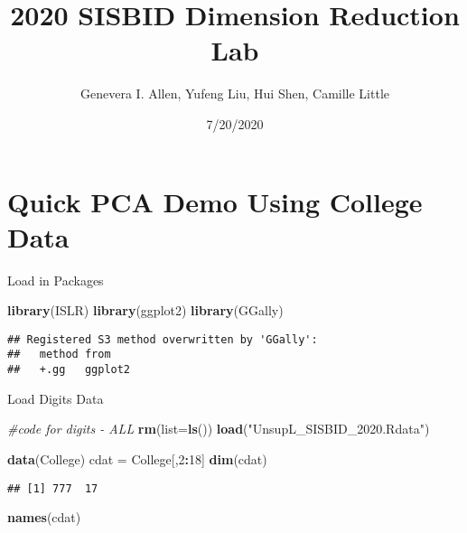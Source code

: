 \documentclass[
]{article}
\title{2020 SISBID Dimension Reduction Lab}
\author{Genevera I. Allen, Yufeng Liu, Hui Shen, Camille Little}
\date{7/20/2020}
\newenvironment{Shaded}{\begin{snugshade}}{\end{snugshade}}
\newcommand{\CommentTok}[1]{\textcolor[rgb]{0.56,0.35,0.01}{\textit{#1}}}
\newcommand{\DataTypeTok}[1]{\textcolor[rgb]{0.13,0.29,0.53}{#1}}
\newcommand{\DecValTok}[1]{\textcolor[rgb]{0.00,0.00,0.81}{#1}}
\newcommand{\KeywordTok}[1]{\textcolor[rgb]{0.13,0.29,0.53}{\textbf{#1}}}
\newcommand{\NormalTok}[1]{#1}
\newcommand{\OperatorTok}[1]{\textcolor[rgb]{0.81,0.36,0.00}{\textbf{#1}}}
\newcommand{\StringTok}[1]{\textcolor[rgb]{0.31,0.60,0.02}{#1}}
\begin{document}
\maketitle

\hypertarget{quick-pca-demo-using-college-data}{%
\section{Quick PCA Demo Using College
Data}\label{quick-pca-demo-using-college-data}}

Load in Packages

\begin{Shaded}
\begin{Highlighting}[]
\KeywordTok{library}\NormalTok{(ISLR)}
\KeywordTok{library}\NormalTok{(ggplot2)}
\KeywordTok{library}\NormalTok{(GGally)}
\end{Highlighting}
\end{Shaded}

\begin{verbatim}
## Registered S3 method overwritten by 'GGally':
##   method from   
##   +.gg   ggplot2
\end{verbatim}

Load Digits Data

\begin{Shaded}
\begin{Highlighting}[]
\CommentTok{#code for digits - ALL}
\KeywordTok{rm}\NormalTok{(}\DataTypeTok{list=}\KeywordTok{ls}\NormalTok{())}
\KeywordTok{load}\NormalTok{(}\StringTok{"UnsupL_SISBID_2020.Rdata"}\NormalTok{)}
\end{Highlighting}
\end{Shaded}

\begin{Shaded}
\begin{Highlighting}[]
\KeywordTok{data}\NormalTok{(College)}
\NormalTok{cdat =}\StringTok{ }\NormalTok{College[,}\DecValTok{2}\OperatorTok{:}\DecValTok{18}\NormalTok{]}
\KeywordTok{dim}\NormalTok{(cdat)}
\end{Highlighting}
\end{Shaded}

\begin{verbatim}
## [1] 777  17
\end{verbatim}

\begin{Shaded}
\begin{Highlighting}[]
\KeywordTok{names}\NormalTok{(cdat)}
\end{Highlighting}
\end{Shaded}
\end{document}
